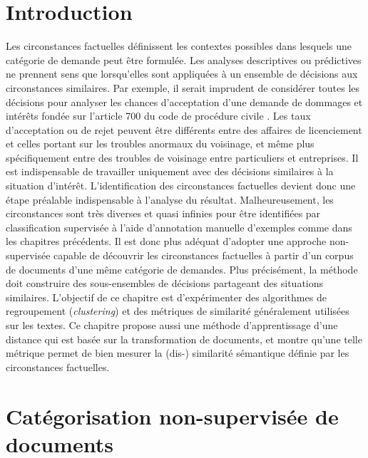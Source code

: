 \section{Introduction}
\label{sec:similarite:introduction}
Les circonstances factuelles définissent les contextes possibles dans lesquels une catégorie de demande peut être formulée. Les analyses descriptives ou prédictives ne prennent sens que lorsqu'elles sont appliquées à un ensemble de décisions aux circonstances similaires. Par exemple, il serait imprudent de considérer toutes les décisions pour analyser les chances d'acceptation d'une demande de dommages et intérêts fondée sur l'\og article 700 du code de procédure civile \fg{}. Les taux d'acceptation ou de rejet peuvent être différents entre des affaires de licenciement et celles portant sur les troubles anormaux du voisinage, et même plus spécifiquement entre des troubles de voisinage entre particuliers et entreprises. %
 Il est indispensable de travailler uniquement avec des décisions similaires à la situation d'intérêt. L'identification des circonstances factuelles devient donc une étape préalable indispensable à l'analyse du résultat. Malheureusement, les circonstances sont très diverses et quasi infinies pour être identifiées par classification supervisée à l'aide d'annotation manuelle d'exemples comme dans les chapitres précédents. Il est donc plus adéquat d'adopter une approche non-supervisée capable de découvrir les circonstances factuelles à partir d'un corpus de documents d'une même catégorie de demandes. Plus précisément, la méthode doit construire des sous-ensembles de décisions partageant des situations similaires.  L'objectif de ce chapitre est d'expérimenter des algorithmes  de regroupement (\textit{clustering}) et des métriques de similarité généralement utilisées sur les textes. Ce chapitre propose aussi une méthode d'apprentissage d'une distance qui est basée sur la transformation de documents, et montre qu'une telle métrique permet de bien mesurer la (dis-) similarité sémantique définie par les circonstances factuelles.


\section{Catégorisation non-supervisée de documents}
\label{sec:similarite:biblio}

